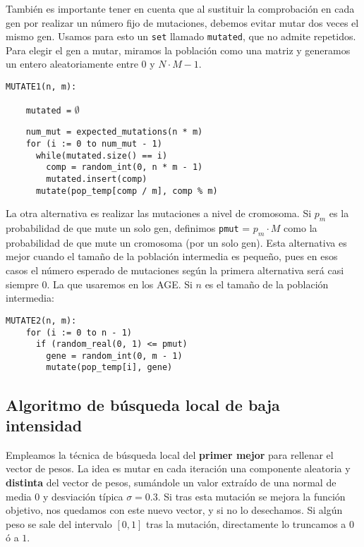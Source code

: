 \documentclass[12pt]{article}
\begin{document}
También es importante tener en cuenta que al sustituir la comprobación en cada gen por realizar un número fijo de mutaciones, debemos evitar mutar dos veces el mismo gen. Usamos para esto un \verb|set| llamado \verb|mutated|, que no admite repetidos. Para elegir el gen a mutar, miramos la población como una matriz y generamos un entero aleatoriamente entre $0$ y $N\cdot M - 1$.

\begin{verbatim}
MUTATE1(n, m):	
\end{verbatim} \vspace{-0.8em}\verb|    mutated =| $\emptyset$ \vspace{-0.5em}
\begin{verbatim}
    num_mut = expected_mutations(n * m)
    for (i := 0 to num_mut - 1) 
      while(mutated.size() == i) 
        comp = random_int(0, n * m - 1)
        mutated.insert(comp)
      mutate(pop_temp[comp / m], comp % m) 
\end{verbatim}

La otra alternativa es realizar las mutaciones a nivel de cromosoma. Si $p_m$ es la probabilidad de que mute un solo gen, definimos \verb|pmut| = $p_m \cdot M$ como la probabilidad de que mute un cromosoma (por un solo gen). Esta alternativa es mejor cuando el tamaño de la población intermedia es pequeño, pues en esos casos el número esperado de mutaciones según la primera alternativa será casi siempre $0$. La que usaremos en los AGE. Si $n$ es el tamaño de la población intermedia:

\begin{verbatim}
MUTATE2(n, m):
    for (i := 0 to n - 1)
      if (random_real(0, 1) <= pmut)
        gene = random_int(0, m - 1)
        mutate(pop_temp[i], gene)
\end{verbatim}

\subsection*{Algoritmo de búsqueda local de baja intensidad}
\label{bl}

Empleamos la técnica de búsqueda local del \textbf{primer mejor} para rellenar el vector de pesos. La idea es mutar en cada iteración una componente aleatoria y \textbf{distinta} del vector de pesos, sumándole un valor extraído de una normal de media $0$ y desviación típica $\sigma = 0.3$. Si tras esta mutación se mejora la función objetivo, nos quedamos con este nuevo vector, y si no lo desechamos. Si algún peso se sale del intervalo $[0,1]$ tras la mutación, directamente lo truncamos a $0$ ó a $1$.\\
\end{document}
